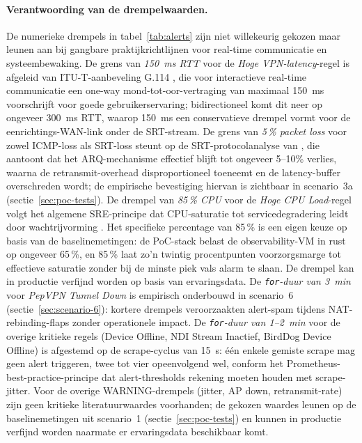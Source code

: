 \paragraph{Verantwoording van de drempelwaarden.} De numerieke drempels in tabel~\ref{tab:alerts} zijn niet willekeurig gekozen maar leunen aan bij gangbare praktijkrichtlijnen voor real-time communicatie en systeembewaking. De grens van \emph{150~ms RTT} voor de \emph{Hoge VPN-latency}-regel is afgeleid van ITU-T-aanbeveling G.114 \autocite{ITU2003G114}, die voor interactieve real-time communicatie een one-way mond-tot-oor-vertraging van maximaal 150~ms voorschrijft voor goede gebruikerservaring; bidirectioneel komt dit neer op ongeveer 300~ms RTT, waarop 150~ms een conservatieve drempel vormt voor de eenrichtings-WAN-link onder de SRT-stream. De grens van \emph{5\,\% packet loss} voor zowel ICMP-loss als SRT-loss steunt op de SRT-protocolanalyse van \textcite{Sharabayko2021}, die aantoont dat het ARQ-mechanisme effectief blijft tot ongeveer 5--10\% verlies, waarna de retransmit-overhead disproportioneel toeneemt en de latency-buffer overschreden wordt; de empirische bevestiging hiervan is zichtbaar in scenario~3a (sectie~\ref{sec:poc-tests}). De drempel van \emph{85\,\% CPU} voor de \emph{Hoge CPU Load}-regel volgt het algemene SRE-principe dat CPU-saturatie tot servicedegradering leidt door wachtrijvorming \autocite{Beyer2016SRE}. Het specifieke percentage van 85\,\% is een eigen keuze op basis van de baselinemetingen: de PoC-stack belast de observability-VM in rust op ongeveer 65\,\%, en 85\,\% laat zo'n twintig procentpunten voorzorgsmarge tot effectieve saturatie zonder bij de minste piek vals alarm te slaan. De drempel kan in productie verfijnd worden op basis van ervaringsdata. De \emph{\texttt{for}-duur van 3~min} voor \emph{PepVPN Tunnel Down} is empirisch onderbouwd in scenario~6 (sectie~\ref{sec:scenario-6}): kortere drempels veroorzaakten alert-spam tijdens NAT-rebinding-flaps zonder operationele impact. De \emph{\texttt{for}-duur van 1--2~min} voor de overige kritieke regels (Device Offline, NDI Stream Inactief, BirdDog Device Offline) is afgestemd op de scrape-cyclus van 15~s: één enkele gemiste scrape mag geen alert triggeren, twee tot vier opeenvolgend wel, conform het Prometheus-best-practice-principe dat alert-thresholds rekening moeten houden met scrape-jitter. Voor de overige WARNING-drempels (jitter, AP down, retransmit-rate) zijn geen kritieke literatuurwaardes voorhanden; de gekozen waardes leunen op de baselinemetingen uit scenario~1 (sectie~\ref{sec:poc-tests}) en kunnen in productie verfijnd worden naarmate er ervaringsdata beschikbaar komt.

